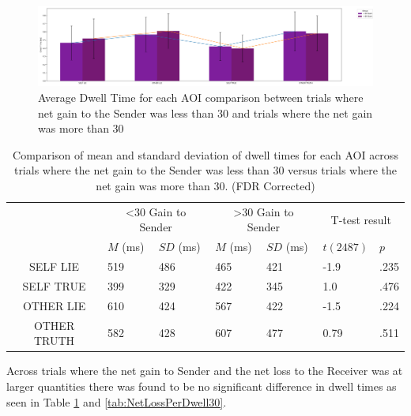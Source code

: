 \documentclass[man, floatsintext]{apa7}
\begin{document}
\begin{figure}[H]
	\centering
	\includegraphics[width=\linewidth]{../plots/RESPONSE/AvgDwellPerGain30.png}
	\caption{Average Dwell Time for each AOI comparison between trials where net gain to the Sender was less than 30 and trials where the net gain was more than 30}
	\label{fig:AvgDwellPerGain30}
\end{figure}

\begin{table}[H]
	\centering
	\begin{tabular}{|c|p{1.5cm}|p{2cm}|p{1.5cm}|p{2cm}|p{2cm}|p{1.5cm}|}
		\hline
		\multirow{2}{*}{} & \multicolumn{2}{c|}{<30 Gain to Sender} & \multicolumn{2}{c|}{>30 Gain to Sender} & \multicolumn{2}{c|}{T-test result} \\ \cline{2-7}
		& $M$ (ms) &$SD$ (ms) & $M$ (ms) & $SD$ (ms) & $t(2487)$ & $p$ \\ \hline
		SELF LIE& 519 & 486 & 465 & 421 & -1.9 & .235  \\ \hline
		SELF TRUE & 399 & 329 & 422 & 345 & 1.0 & .476  \\ \hline
		OTHER LIE & 610 & 424 & 567 & 422 & -1.5 & .224 \\ \hline
		OTHER TRUTH & 582 & 428 & 607 & 477 & 0.79 & .511 \\ \hline
	\end{tabular}
	\vspace{0.3cm}
	\caption{Comparison of mean and standard deviation of dwell times for each AOI across trials where the net gain to the Sender was less than 30 versus trials where the net gain was more than 30. (FDR Corrected)}
	\label{tab:NetGainDwell30}
\end{table}

Across trials where the net gain to Sender and the net loss to the Receiver was at larger quantities there was found to be no significant difference in dwell times as seen in Table \ref{tab:NetGainDwell30} and \ref{tab:NetLossPerDwell30}.
\end{document}
